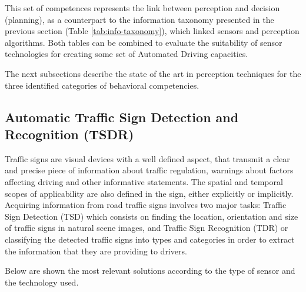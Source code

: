 This set of competences represents the link between perception and decision
(planning), as a counterpart to the information taxonomy presented in the
previous section (Table \ref{tab:info-taxonomy}), which linked sensors and 
perception algorithms. 
Both tables can be combined to evaluate the suitability of sensor technologies
for creating some set of Automated Driving capacities.

The next subsections describe the state of the art in perception techniques for
the three identified categories of behavioral competencies.

\subsection{Automatic Traffic Sign Detection and Recognition (TSDR)} 
Traffic signs are visual devices with a well defined aspect, that transmit a 
clear and precise piece of information about traffic regulation, warnings about
factors affecting driving and other informative statements. The spatial and
temporal scopes of applicability are also defined in the sign, either 
explicitly or implicitly.
Acquiring information from road traffic signs involves two major tasks: 
Traffic Sign Detection (TSD) which consists on finding the location, 
orientation and size of traffic signs in natural scene images, and Traffic Sign 
Recognition (TDR) or classifying the detected traffic signs into types 
and categories in order to extract the information that they are providing to 
drivers.

Below are shown the most relevant solutions according to the type of sensor 
and the technology used.


